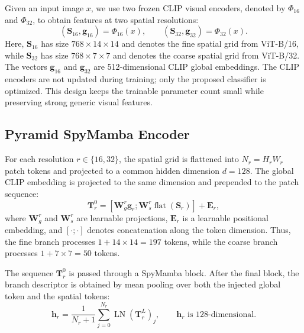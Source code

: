 Given an input image $x$, we use two frozen CLIP visual encoders, denoted by $\Phi_{16}$ and $\Phi_{32}$, to obtain features at two spatial resolutions:
\begin{equation}
  (\mathbf{S}_{16}, \mathbf{g}_{16}) = \Phi_{16}(x), \qquad
  (\mathbf{S}_{32}, \mathbf{g}_{32}) = \Phi_{32}(x).
  \label{eq:clip-features}
\end{equation}
Here, $\mathbf{S}_{16}$ has size $768 \times 14 \times 14$ and denotes the fine spatial grid from ViT-B/16, while $\mathbf{S}_{32}$ has size $768 \times 7 \times 7$ and denotes the coarse spatial grid from ViT-B/32. The vectors $\mathbf{g}_{16}$ and $\mathbf{g}_{32}$ are 512-dimensional CLIP global embeddings. The CLIP encoders are not updated during training; only the proposed classifier is optimized. This design keeps the trainable parameter count small while preserving strong generic visual features.

\subsection{Pyramid SpyMamba Encoder}

For each resolution $r \in \{16, 32\}$, the spatial grid is flattened into $N_r = H_r W_r$ patch tokens and projected to a common hidden dimension $d=128$. The global CLIP embedding is projected to the same dimension and prepended to the patch sequence:
\begin{equation}
  \mathbf{T}_{r}^{0}
  =
  \left[
    \mathbf{W}_{g}^{r}\mathbf{g}_{r};
    \mathbf{W}_{s}^{r}\operatorname{flat}(\mathbf{S}_{r})
  \right]
  +
  \mathbf{E}_{r},
  \label{eq:token-projection}
\end{equation}
where $\mathbf{W}_{g}^{r}$ and $\mathbf{W}_{s}^{r}$ are learnable projections, $\mathbf{E}_{r}$ is a learnable positional embedding, and $[\cdot;\cdot]$ denotes concatenation along the token dimension. Thus, the fine branch processes $1+14\times14=197$ tokens, while the coarse branch processes $1+7\times7=50$ tokens.

The sequence $\mathbf{T}_{r}^{0}$ is passed through a SpyMamba block. After the final block, the branch descriptor is obtained by mean pooling over both the injected global token and the spatial tokens:
\begin{equation}
  \mathbf{h}_{r}
  =
  \frac{1}{N_r+1}
  \sum_{j=0}^{N_r}
  \operatorname{LN}(\mathbf{T}_{r}^{L})_{j},
  \qquad
  \mathbf{h}_{r} \text{ is 128-dimensional}.
  \label{eq:branch-pooling}
\end{equation}

